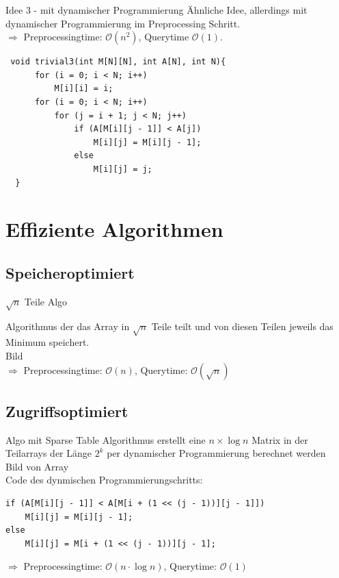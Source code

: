 \documentclass[11pt]{beamer}
\newcommand*{\Oh}{\mathcal{O}}
\begin{document}
\begin{frame}[fragile]
\begin{block}{Idee 3 - mit dynamischer Programmierung}
Ähnliche Idee, allerdings mit dynamischer Programmierung im Preprocessing Schritt.\\
  $\Rightarrow$ Preprocessingtime: $\Oh(n^2)$, Querytime $\Oh(1)$.
\end{block}
\vspace{-6mm}
  \pause
  \begin{verbatim}
 void trivial3(int M[N][N], int A[N], int N){
      for (i = 0; i < N; i++)
          M[i][i] = i;
      for (i = 0; i < N; i++)
          for (j = i + 1; j < N; j++)
              if (A[M[i][j - 1]] < A[j])
                  M[i][j] = M[i][j - 1];
              else
                  M[i][j] = j;
  }
  \end{verbatim}
  \vspace{-5mm}
\end{frame}


\section{Effiziente Algorithmen}
\frame{\sectionpage}

\subsection{Speicheroptimiert}

\begin{frame}[fragile]
\begin{block}{$\sqrt n$ Teile Algo}

Algorithmus der das Array in $\sqrt n$ Teile teilt und von diesen Teilen jeweils das Minimum speichert.\\[5mm]
Bild\\[5mm]
$\Rightarrow$ Preprocessingtime: $\Oh(n)$, Querytime: $\Oh(\sqrt n)$
\end{block}
\end{frame}


\subsection{Zugriffsoptimiert}

\begin{frame}[fragile]
\begin{block}{Algo mit Sparse Table}
Algorithmus erstellt eine $n \times \log n$ Matrix in der Teilarrays der Länge $2^k$ per dynamischer Programmierung berechnet werden\\[5mm]
Bild von Array\\[5mm]

Code des dynmischen Programmierungschritts:
\vspace{-5mm}
\begin{verbatim}
if (A[M[i][j - 1]] < A[M[i + (1 << (j - 1))][j - 1]])
    M[i][j] = M[i][j - 1];
else
    M[i][j] = M[i + (1 << (j - 1))][j - 1];
\end{verbatim}
$\Rightarrow$ Preprocessingtime: $\Oh(n\cdot\log n)$, Querytime: $\Oh(1)$
\end{block}
\end{frame}
\end{document}
